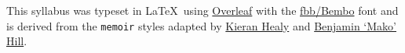 \documentclass[10pt]{memoir}
\def\datedate{\datedayname,\space\datemonthname~\thedateday}
\newcommand{\adddays}[1]{%
    \addtocounter{datenumber}{#1}%
    \setdatebynumber{\thedatenumber}%
}
\begin{document}
This syllabus was typeset in \LaTeX~using \href{http://www.sharelatex.com}{Overleaf} with the \href{http://www.tug.dk/FontCatalogue/fbb/}{fbb/Bembo} font and is derived from the \texttt{memoir} styles adapted by \href{https://github.com/kjhealy/latex-custom-kjh}{Kieran Healy} and \href{http://projects.mako.cc/source/?p=latex_mako;a=summary}{Benjamin `Mako' Hill}.

\clearpage





\end{document}

